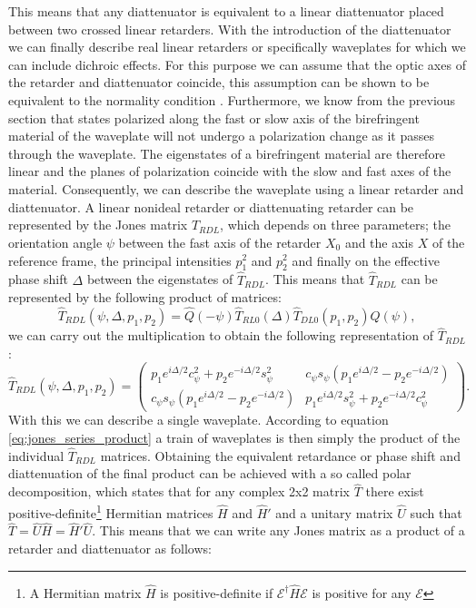 This means that any diattenuator is equivalent to a linear diattenuator placed between two crossed linear retarders. With the introduction of the diattenuator we can finally describe real linear retarders or specifically waveplates for which we can include dichroic effects. For this purpose we can assume that the optic axes of the retarder and diattenuator coincide, this assumption can be shown to be equivalent to the normality condition \cite{Bass1995HandbookOptics}. Furthermore, we know from the previous section that states polarized along the fast or slow axis of the birefringent material of the waveplate will not undergo a polarization change as it passes through the waveplate. The eigenstates of a birefringent material are therefore linear and the planes of polarization coincide with the slow and fast axes of the material. Consequently, we can describe the waveplate using a linear retarder and diattenuator. A linear nonideal retarder or diattenuating retarder can be represented by the Jones matrix $\hat{T}_{RDL}$, which depends on three parameters; the orientation angle $\psi$ between the fast axis of the retarder $X_0$ and the axis $X$ of the reference frame, the principal intensities $p_1^2$ and $p_2^2$ and finally on the effective phase shift $\Delta$ between the eigenstates of $\hat{T}_{RDL}$. This means that $\hat{T}_{RDL}$ can be represented by the following product of matrices:
\begin{equation}
    \hat{T}_{RDL}(\psi, \Delta, p_1, p_2) = \hat{Q}(-\psi)\hat{T}_{RL0}(\Delta)\hat{T}_{DL0}(p_1, p_2)\hat{Q}(\psi),
\end{equation}
we can carry out the multiplication to obtain the following representation of $\hat{T}_{RDL}$:
\begin{equation}
    \hat{T}_{RDL}(\psi, \Delta, p_1, p_2) = 
    \begin{pmatrix} 
    p_1e^{i\Delta/2}c_{\psi}^2+p_2e^{-i\Delta/2}s_{\psi}^2 & c_{\psi}s_{\psi}\left(p_1e^{i\Delta/2}-p_2e^{-i\Delta/2}\right) \\
    c_{\psi}s_{\psi}\left(p_1e^{i\Delta/2}-p_2e^{-i\Delta/2}\right) & 
    p_1e^{i\Delta/2}s_{\psi}^2+p_2e^{-i\Delta/2}c_{\psi}^2
    \end{pmatrix}.
\end{equation}
With this we can describe a single waveplate. According to equation \ref{eq:jones_series_product} a train of waveplates is then simply the product of the individual $\hat{T}_{RDL}$ matrices. Obtaining the equivalent retardance or phase shift and diattenuation of the final product can be achieved with a so called polar decomposition, which states that for any complex 2x2 matrix $\hat{T}$ there exist positive-definite\footnote{A Hermitian matrix $\hat{H}$ is positive-definite if $\bm{\mathcal{E}}^{\dagger}\hat{H}\bm{\mathcal{E}}$ is positive for any $\bm{\mathcal{E}}$} Hermitian matrices $\hat{H}$ and $\hat{H}'$ and a unitary matrix $\hat{U}$ such that $\hat{T}=\hat{U}\hat{H}=\hat{H}'\hat{U}$. This means that we can write any Jones matrix as a product of a retarder and diattenuator as follows:
